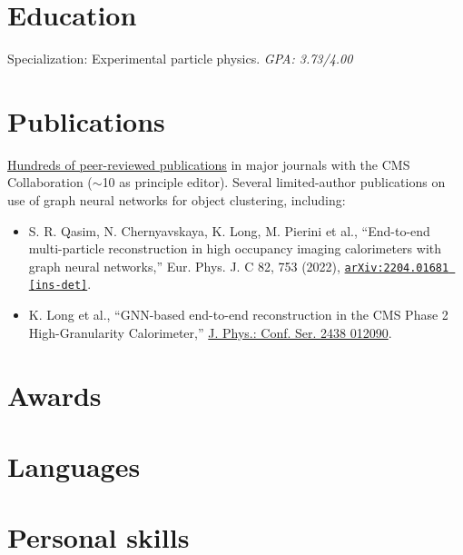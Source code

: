 \documentclass[9pt,a4paper]{moderncv}
\begin{document}
\section{Education}
{
    Specialization: Experimental particle physics.
    \normalsize \textit{GPA: 3.73/4.00} 
}

\section{Publications}
\href{https://inspirehep.net/authors/1280606}{Hundreds of peer-reviewed publications} in major journals with the CMS Collaboration ($\sim$10 as principle editor). Several limited-author publications on use of graph neural networks for object clustering, including:
\begin{itemize}
    \item S. R. Qasim, N. Chernyavskaya, K. Long, M. Pierini et al., ``End-to-end multi-particle reconstruction in high occupancy imaging calorimeters with graph neural networks,'' Eur. Phys. J. C 82, 753 (2022), \href{https://arxiv.org/abs/2204.01681}{\texttt{arXiv:2204.01681 [ins-det]}}.
    \item K. Long et al., ``GNN-based end-to-end reconstruction in the CMS Phase 2 High-Granularity Calorimeter,'' \href{https://arxiv.org/abs/2203.01189}{J. Phys.: Conf. Ser. 2438 012090}.
\end{itemize}

\pagebreak
\section{Awards}
\section{Languages}

\section{Personal skills}
\end{document}
